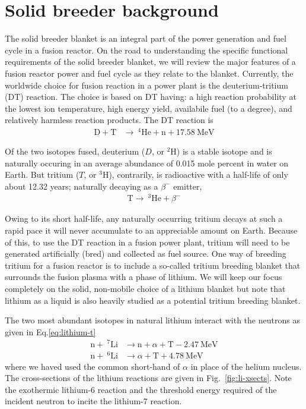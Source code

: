 \section{Solid breeder background}\label{sec:intro-blanket-description}

The solid breeder blanket is an integral part of the power generation and fuel cycle in a fusion reactor. On the road to understanding the specific functional requirements of the solid breeder blanket, we will review the major features of a fusion reactor power and fuel cycle as they relate to the blanket. Currently, the worldwide choice for fusion reaction in a power plant is the deuterium-tritium (DT) reaction. The choice is based on DT having: a high reaction probability at the lowest ion temperature, high energy yield, availabile fuel (to a degree), and relatively harmless reaction products. The DT reaction is
\begin{align}
	\mathrm{D} + \mathrm{T}&\xrightarrow{}~^4\mathrm{He}+\mathrm{n}+17.58~\text{MeV} \label{eq:dt-reaction}
\end{align}

Of the two isotopes fused, deuterium ($D$, or $^2$H) is a stable isotope and is naturally occuring in an average abundance of 0.015 mole percent in water on Earth. But tritium ($T$, or $^3$H), contrarily, is radioactive with a half-life of only about 12.32 years; naturally decaying as a $\beta^-$ emitter,
\begin{align}\label{eq:t-decay}
	\mathrm{T} \xrightarrow{}~^3\mathrm{He} + \beta^-
\end{align}

Owing to its short half-life, any naturally occurring tritium decays at such a rapid pace it will never accumulate to an appreciable amount on Earth. Because of this, to use the DT reaction in a fusion power plant, tritium will need to be generated artificially (bred) and collected as fuel source. One way of breeding tritium for a fusion reactor is to include a so-called tritium breeding blanket that surrounds the fusion plasma with a phase of lithium. We will keep our focus completely on the solid, non-mobile choice of a lithium blanket but note that lithium as a liquid is also heavily studied as a potential tritium breeding blanket.

The two most abundant isotopes in natural lithium interact with the neutrons as given in Eq.\ref{eq:lithium-t}
\begin{subequations}\label{eq:lithium-t}
\begin{align}
	\mathrm{n} + ~^7\mathrm{Li} &\xrightarrow ~\mathrm{n}+\alpha + \mathrm{T} -2.47~\text{MeV}\label{eq:li7-t}\\
	\mathrm{n} + ~^6\mathrm{Li} &\xrightarrow ~ \alpha + \mathrm{T} +4.78~\text{MeV} \label{eq:li6-t}
\end{align}
\end{subequations}
where we haved used the common short-hand of $\alpha$ in place of the helium nucleus. The cross-sections of the lithium reactions are given in Fig.~\ref{fig:li-xsects}. Note the exothermic lithium-6 reaction and the threshold energy required of the incident neutron to incite the lithium-7 reaction.

